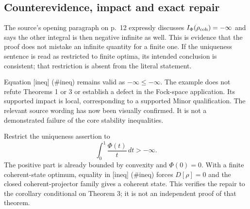 \documentclass[10pt]{article}
\begin{document}
\subsection*{Counterevidence, impact and exact repair}
The source’s opening paragraph on p. 12 expressly discusses \(I_\Phi(\rho_{\rm coh})=-\infty\) and says the other integral is then negative infinite as well. This is evidence that the proof does not mistake an infinite quantity for a finite one. If the uniqueness sentence is read as restricted to finite optima, its intended conclusion is consistent; that restriction is absent from the literal statement.\par
Equation [ineq] (\#ineq) remains valid as \(-\infty\leq-\infty\). The example does not refute Theorems 1 or 3 or establish a defect in the Fock-space application. Its supported impact is local, corresponding to a supported Minor qualification. The relevant source wording has now been visually confirmed. It is not a demonstrated failure of the core stability inequalities.\par
Restrict the uniqueness assertion to \[\int_0^1\frac{\Phi(t)}t\,dt>-\infty .\] The positive part is already bounded by convexity and \(\Phi(0)=0\). With a finite coherent-state optimum, equality in [ineq] (\#ineq) forces \(D[\rho]=0\) and the closed coherent-projector family gives a coherent state. This verifies the repair to the corollary conditional on Theorem 3; it is not an independent proof of that theorem.\par
\end{document}
